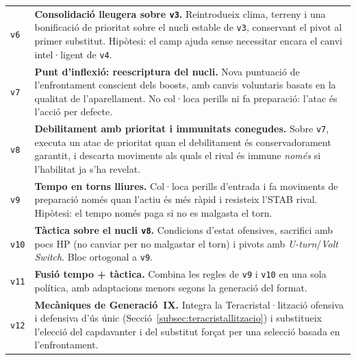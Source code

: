 \begin{table}[htbp]
\begin{tabularx}{\textwidth}{lX}
        \arrayrulecolor{gray!30}\hline\arrayrulecolor{black}
        \texttt{v6}     & \textbf{Consolidació lleugera sobre \texttt{v3}.} Reintrodueix clima, terreny i una bonificació de prioritat sobre el nucli estable de \texttt{v3}, conservant el pivot al primer substitut. Hipòtesi: el camp ajuda sense necessitar encara el canvi intel·ligent de \texttt{v4}.                  \\
        \arrayrulecolor{gray!30}\hline\arrayrulecolor{black}
        \texttt{v7}     & \textbf{Punt d'inflexió: reescriptura del nucli.} Nova puntuació de l'enfrontament conscient dels boosts, amb canvis voluntaris basats en la qualitat de l'aparellament. No col·loca perills ni fa preparació: l'atac és l'acció per defecte.                                                       \\
        \arrayrulecolor{gray!30}\hline\arrayrulecolor{black}
        \texttt{v8}     & \textbf{Debilitament amb prioritat i immunitats conegudes.} Sobre \texttt{v7}, executa un atac de prioritat quan el debilitament és conservadorament garantit, i descarta moviments als quals el rival és immune \emph{només} si l'habilitat ja s'ha revelat.                                       \\
        \arrayrulecolor{gray!30}\hline\arrayrulecolor{black}
        \texttt{v9}     & \textbf{Tempo en torns lliures.} Col·loca perills d'entrada i fa moviments de preparació només quan l'actiu és més ràpid i resisteix l'STAB rival. Hipòtesi: el tempo només paga si no es malgasta el torn.                                                                                         \\
        \arrayrulecolor{gray!30}\hline\arrayrulecolor{black}
        \texttt{v10}    & \textbf{Tàctica sobre el nucli \texttt{v8}.} Condicions d’estat ofensives, sacrifici amb pocs HP (no canviar per no malgastar el torn) i pivots amb \emph{U-turn}/\emph{Volt Switch}. Bloc ortogonal a \texttt{v9}.                                                                                 \\
        \arrayrulecolor{gray!30}\hline\arrayrulecolor{black}
        \texttt{v11}    & \textbf{Fusió tempo + tàctica.} Combina les regles de \texttt{v9} i \texttt{v10} en una sola política, amb adaptacions menors segons la generació del format.                                                                                                                                       \\
        \arrayrulecolor{gray!30}\hline\arrayrulecolor{black}
        \texttt{v12}    & \textbf{Mecàniques de Generació~IX.} Integra la Teracristal·lització ofensiva i defensiva d'ús únic (Secció~\ref{subsec:teracristallitzacio}) i substitueix l'elecció del capdavanter i del substitut forçat per una selecció basada en l'enfrontament.                                             \\

\end{tabularx}
\end{table}
